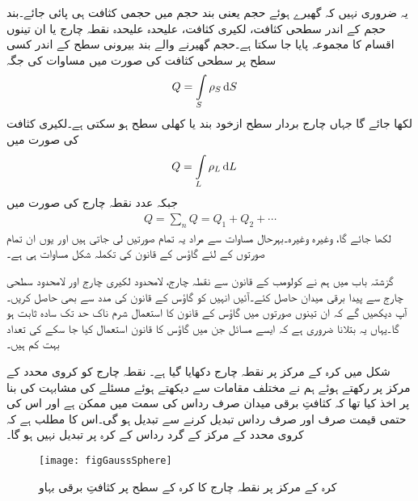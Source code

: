 یہ ضروری نہیں کہ گھیرے ہوئے حجم یعنی بند حجم میں حجمی کثافت ہی پائی جائے۔بند حجم کے اندر  سطحی کثافت، لکیری کثافت، علیحدہ علیحدہ نقطہ چارج یا ان تینوں اقسام کا مجموعہ پایا جا سکتا ہے۔حجم گھیرنے والے بند بیرونی سطح کے اندر کسی سطح پر  سطحی کثافت کی صورت میں مساوات  کی جگہ
\begin{align}
Q&=\int\limits_{S} \rho_S \dif S
\end{align}
لکھا جائے گا جہاں چارج بردار سطح ازخود بند یا کھلی سطح ہو سکتی ہے۔لکیری کثافت کی صورت میں
\begin{align}
Q&=\int\limits_{L} \rho_L \dif L
\end{align}
جبکہ   عدد نقطہ چارج کی صورت میں
\begin{align}
Q=\sum_n Q= Q_1+Q_2+\cdots
\end{align}
لکھا جائے گا، وغیرہ وغیرہ۔بہرحال مساوات  سے مراد یہ تمام صورتیں لی جاتی ہیں اور یوں ان تمام صورتوں کے لئے گاؤس کے  قانون کی تکملہ شکل مساوات  ہی ہے۔


گزشتہ باب میں ہم نے کولومب کے قانون سے نقطہ چارج، لامحدود  لکیری چارج اور لامحدود سطحی چارج  سے پیدا برقی میدان حاصل کئے۔آئیں انہیں کو  گاؤس کے قانون کی مدد سے بھی حاصل کریں۔ آپ دیکھیں گے کہ ان تینوں صورتوں میں گاؤس کے قانون کا استعمال شرم ناک حد تک سادہ ثابت ہو گا۔یہاں یہ بتلانا ضروری ہے کہ ایسے  مسائل جن میں گاؤس کا قانون استعمال کیا جا سکے کی تعداد  بہت کم ہیں۔

شکل  میں کرہ کے مرکز پر نقطہ چارج دکھایا گیا ہے۔ نقطہ چارج کو کروی محدد کے مرکز پر رکھتے ہوئے ہم  نے مختلف مقامات سے دیکھتے ہوئے مسئلے کی مشابہت کی بنا پر اخذ کیا تھا کہ کثافتِ برقی میدان صرف رداس کی سمت میں ممکن ہے اور اس  کی حتمی قیمت صرف اور صرف رداس  تبدیل کرنے سے تبدیل ہو گی۔اس کا مطلب ہے کہ کروی محدد کے مرکز کے گرد رداس  کے کرہ  پر  تبدیل نہیں ہو گا۔
\begin{figure}
\centering
\texttt{[image: figGaussSphere]}
\caption{کرہ کے مرکز پر نقطہ چارج کا کرہ کے سطح پر کثافتِ برقی بہاو}
\label{شکل_گاؤس_کرہ_کی_سطح_پر_مرکز_کے_نقطہ_چرج_کا_میدان}
\end{figure}

